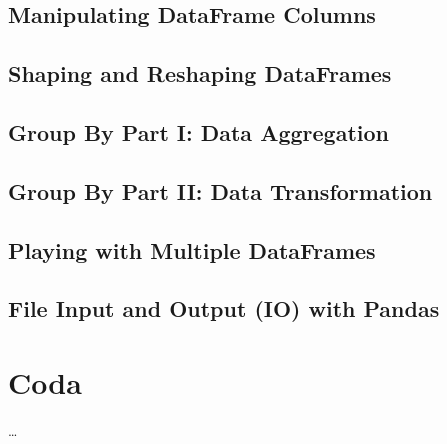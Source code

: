 \documentclass[a4paper,11pt]{book}
\numberwithin{figure}{chapter}
\numberwithin{table}{chapter}
\begin{document}
\section{Manipulating DataFrame Columns}
\label{sec:manipulating_df_columns}


\section{Shaping and Reshaping DataFrames}


\section{Group By Part I: Data Aggregation}


\section{Group By Part II: Data Transformation}


\section{Playing with Multiple DataFrames}



\section{File Input and Output (IO) with Pandas}
\label{sec:pandas_io}

\theendnotes

\chapter{Coda}
\ldots

\clearpage
\end{document}

